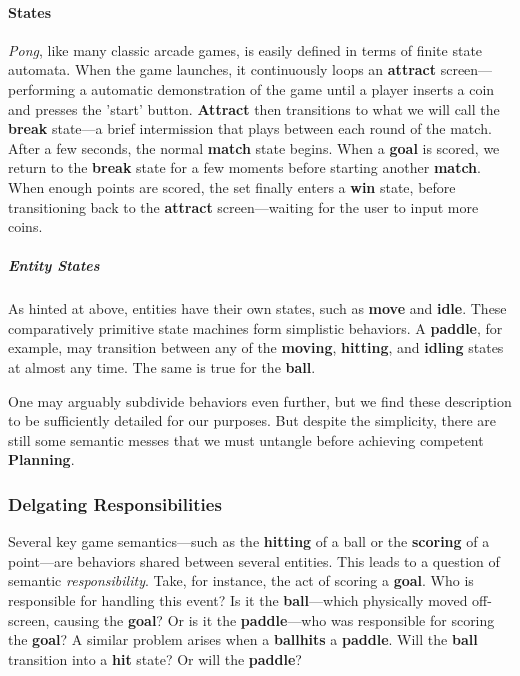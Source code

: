 \documentclass{report}
\newcommand{\plan}{\textbf{Planning}\xspace}
\newcommand{\state}[1]{\textbf{#1}}
\newcommand{\pad}{\textbf{paddle}\xspace}
\newcommand{\ball}{\textbf{ball}\xspace}
\begin{document}
\paragraph{States} 

\emph{Pong}, like many classic arcade games, is easily defined in terms of finite state automata. When the game launches, it continuously loops an \state{attract} screen---performing a automatic demonstration of the game until a player inserts a coin and presses the 'start' button. \state{Attract} then transitions to what we will call the \state{break} state---a brief intermission that plays between each round of the match. After a few seconds, the normal \state{match} state begins. When a \state{goal} is scored, we return to the \state{break} state for a few moments before starting another \state{match}. When enough points are scored, the set finally enters a \state{win} state, before transitioning back to the \state{attract} screen---waiting for the user to input more coins. 

\subparagraph{Entity States}
As hinted at above, entities have their own states, such as \state{move} and \state{idle}. These comparatively primitive state machines form simplistic behaviors. A \pad, for example, may transition between any of the  \state{moving}, \state{hitting}, and \state{idling} states at almost any time. The same is true for the \ball. 

One may arguably subdivide behaviors even further, but we find these description to be sufficiently detailed for our purposes. But despite the simplicity, there are still some semantic messes that we must untangle before achieving competent \plan. 

\subsubsection{Delgating Responsibilities}

Several key game semantics---such as the \state{hitting} of a ball or the \state{scoring} of a point---are behaviors shared between several entities. This leads to a question of semantic \emph{responsibility}. Take, for instance, the act of scoring a \state{goal}. Who is responsible for handling this event? Is it the \ball---which physically moved off-screen, causing the \state{goal}? Or is it the \pad---who was responsible for scoring the \state{goal}? A similar problem arises when a \ball \state{hits} a \pad. Will the \ball transition into a \state{hit} state? Or will the \pad? 
\end{document}
